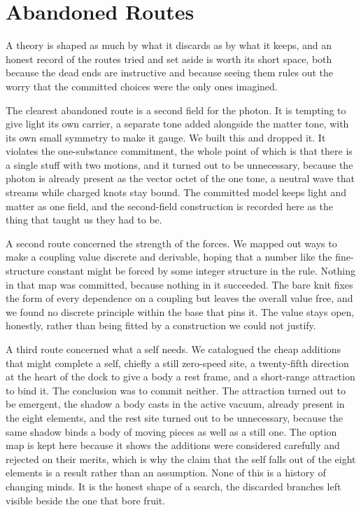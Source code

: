 \section{Abandoned Routes}
\label{app:abandoned}

A theory is shaped as much by what it discards as by what it keeps, and an honest record of the routes tried and set aside is worth its short space, both because the dead ends are instructive and because seeing them rules out the worry that the committed choices were the only ones imagined.

The clearest abandoned route is a second field for the photon. It is tempting to give light its own carrier, a separate tone added alongside the matter tone, with its own small symmetry to make it gauge. We built this and dropped it. It violates the one-substance commitment, the whole point of which is that there is a single stuff with two motions, and it turned out to be unnecessary, because the photon is already present as the vector octet of the one tone, a neutral wave that streams while charged knots stay bound. The committed model keeps light and matter as one field, and the second-field construction is recorded here as the thing that taught us they had to be.

A second route concerned the strength of the forces. We mapped out ways to make a coupling value discrete and derivable, hoping that a number like the fine-structure constant might be forced by some integer structure in the rule. Nothing in that map was committed, because nothing in it succeeded. The bare knit fixes the form of every dependence on a coupling but leaves the overall value free, and we found no discrete principle within the base that pins it. The value stays open, honestly, rather than being fitted by a construction we could not justify.

A third route concerned what a self needs. We catalogued the cheap additions that might complete a self, chiefly a still zero-speed site, a twenty-fifth direction at the heart of the dock to give a body a rest frame, and a short-range attraction to bind it. The conclusion was to commit neither. The attraction turned out to be emergent, the shadow a body casts in the active vacuum, already present in the eight elements, and the rest site turned out to be unnecessary, because the same shadow binds a body of moving pieces as well as a still one. The option map is kept here because it shows the additions were considered carefully and rejected on their merits, which is why the claim that the self falls out of the eight elements is a result rather than an assumption. None of this is a history of changing minds. It is the honest shape of a search, the discarded branches left visible beside the one that bore fruit.
